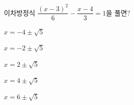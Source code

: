 이차방정식 $\dfrac{(x-3)^2}{6}-\dfrac{x-4}{3}=1$을 풀면?
\begin{choicesii}{\rule[-3ex]{0pt}{8ex}$x=-4\pm\sqrt{5}$}{\rule[-3ex]{0pt}{8ex}$x=-2\pm\sqrt{5}$}{\rule[-3ex]{0pt}{8ex}$x=2\pm\sqrt{5}$}{\rule[-3ex]{0pt}{8ex}$x=4\pm\sqrt{5}$}{\rule[-3ex]{0pt}{8ex}$x=6\pm\sqrt{5}$}\end{choicesii}
